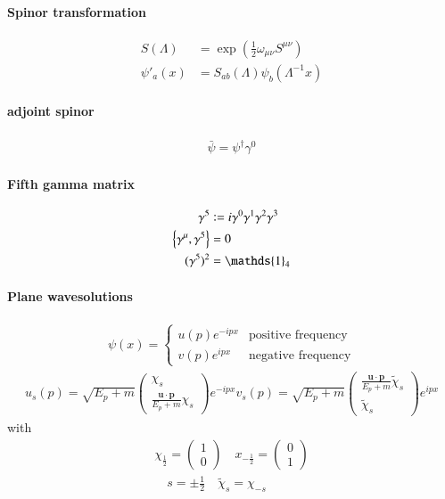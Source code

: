 \documentclass{scrartcl}
\newcommand{\defeq}{\vcentcolon =}
\newcommand{\id}{\mathds{1}}
\numberwithin{equation}{section}
\begin{document}
\paragraph{Spinor transformation}
\begin{align}
	S(\Lambda) &= \exp(\frac{1}{2} \omega_{\mu\nu}S^{\mu\nu}) \\
	\psi'_a(x) &= S_{ab}(\Lambda) \psi_b(\Lambda^{-1}x)
\end{align}
\paragraph{adjoint spinor}
\begin{align}
	\bar{\psi} = \psi^\dagger \gamma^0
\end{align}
\paragraph{Fifth gamma matrix}
\begin{align}
	\gamma^5 &\defeq i \gamma^0 \gamma^1 \gamma^2 \gamma^3 \\
	\left\{ \gamma^\mu, \gamma^5 \right\} &= 0 \\
	(\gamma^5)^2 &= \id_4
\end{align}
\paragraph{Plane wavesolutions}
\begin{align}
	\psi(x) = \begin{cases}
		u(p) e^{-ipx} & \text{positive frequency} \\
		v(p) e^{ipx} & \text{negative frequency}
	\end{cases}
\end{align}
\begin{align}
	u_s	(p) = \sqrt{E_p+m} \begin{pmatrix} \chi_s \\ \frac{\pmb{u}\cdot\pmb{p}}{E_p+m}\chi_s\end{pmatrix} e^{-ipx}
	v_s	(p) = \sqrt{E_p+m} \begin{pmatrix} \frac{\pmb{u}\cdot\pmb{p}}{E_p+m}\tilde{\chi}_s \\ \tilde{\chi}_s \end{pmatrix} e^{ipx}
\end{align}
with
\begin{align*}
	\chi_{\frac{1}{2}} = \begin{pmatrix} 1 \\ 0 \end{pmatrix} \quad x_{-\frac{1}{2}} = \begin{pmatrix} 0 \\ 1\end{pmatrix} \\
	\quad s=\pm\frac{1}{2} \quad \tilde{\chi}_s = \chi_{-s}
\end{align*}
\end{document}
